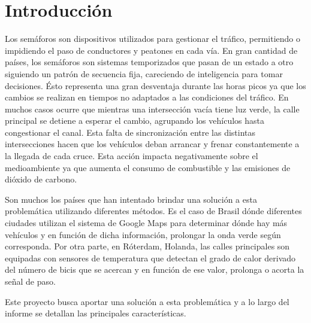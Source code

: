 \section{Introducción}
Los semáforos son dispositivos utilizados para gestionar el tráfico, permitiendo o impidiendo el paso de conductores y peatones en cada vía. En gran cantidad de países, los semáforos son sistemas temporizados
que pasan de un estado a otro siguiendo un patrón de secuencia fija, careciendo de inteligencia para tomar decisiones. Ésto representa una gran desventaja durante las horas picos ya que los cambios se realizan en tiempos no adaptados a las condiciones del tráfico. En muchos casos ocurre que mientras una intersección vacía tiene luz verde, la calle principal se detiene a esperar el cambio, agrupando los vehículos hasta congestionar el canal.
Esta falta de sincronización entre las distintas intersecciones hacen que los vehículos deban arrancar y frenar constantemente a la llegada de cada cruce. Esta acción impacta negativamente sobre el medioambiente ya que aumenta el consumo de combustible y las emisiones de dióxido de carbono.

Son muchos los países que han intentado brindar una solución a esta problemática utilizando diferentes métodos. Es el caso de Brasil dónde diferentes ciudades utilizan el sistema de Google Maps para determinar dónde hay más vehículos y en función de dicha información, prolongar la onda verde según corresponda.
Por otra parte, en Róterdam, Holanda, las calles principales son equipadas con sensores de temperatura que detectan el grado de calor derivado del número de bicis que se acercan y en función de ese valor, prolonga o acorta la señal de paso.

Este proyecto busca aportar una solución a esta problemática y a lo largo del informe se detallan las principales características.